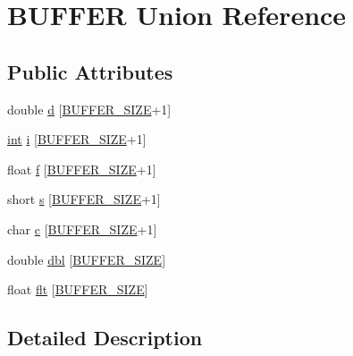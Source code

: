 \hypertarget{union_b_u_f_f_e_r}{}\section{B\+U\+F\+F\+ER Union Reference}
\label{union_b_u_f_f_e_r}
\subsection*{Public Attributes}
\begin{DoxyCompactItemize}
\item 
double \hyperlink{union_b_u_f_f_e_r_a0883f3ab62eb854ba89f76146ca79910}{d} \mbox{[}\hyperlink{test__audio__analyzer_8c_a6b20d41d6252e9871430c242cb1a56e7}{B\+U\+F\+F\+E\+R\+\_\+\+S\+I\+ZE}+1\mbox{]}
\item 
\hyperlink{xmltok_8h_a5a0d4a5641ce434f1d23533f2b2e6653}{int} \hyperlink{union_b_u_f_f_e_r_a4835f167a59c49203108f8039de7abcd}{i} \mbox{[}\hyperlink{test__audio__analyzer_8c_a6b20d41d6252e9871430c242cb1a56e7}{B\+U\+F\+F\+E\+R\+\_\+\+S\+I\+ZE}+1\mbox{]}
\item 
float \hyperlink{union_b_u_f_f_e_r_aa33765505130ffb63893c570f0018838}{f} \mbox{[}\hyperlink{test__audio__analyzer_8c_a6b20d41d6252e9871430c242cb1a56e7}{B\+U\+F\+F\+E\+R\+\_\+\+S\+I\+ZE}+1\mbox{]}
\item 
short \hyperlink{union_b_u_f_f_e_r_af0c8b6f5f3d01c7d814b2fdf7a0bcdaa}{s} \mbox{[}\hyperlink{test__audio__analyzer_8c_a6b20d41d6252e9871430c242cb1a56e7}{B\+U\+F\+F\+E\+R\+\_\+\+S\+I\+ZE}+1\mbox{]}
\item 
char \hyperlink{union_b_u_f_f_e_r_a34898ba11954dc86ce7cd826fe110fd7}{c} \mbox{[}\hyperlink{test__audio__analyzer_8c_a6b20d41d6252e9871430c242cb1a56e7}{B\+U\+F\+F\+E\+R\+\_\+\+S\+I\+ZE}+1\mbox{]}
\item 
double \hyperlink{union_b_u_f_f_e_r_ae3629fe0ac01dbeb28795ccba76f8356}{dbl} \mbox{[}\hyperlink{test__audio__analyzer_8c_a6b20d41d6252e9871430c242cb1a56e7}{B\+U\+F\+F\+E\+R\+\_\+\+S\+I\+ZE}\mbox{]}
\item 
float \hyperlink{union_b_u_f_f_e_r_a6318edc9f75c475a04b4d60c6069aa17}{flt} \mbox{[}\hyperlink{test__audio__analyzer_8c_a6b20d41d6252e9871430c242cb1a56e7}{B\+U\+F\+F\+E\+R\+\_\+\+S\+I\+ZE}\mbox{]}
\end{DoxyCompactItemize}


\subsection{Detailed Description}


